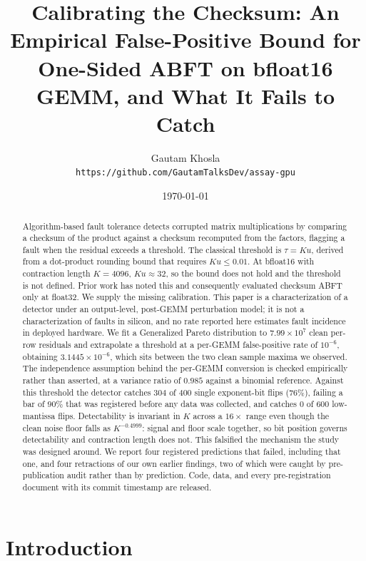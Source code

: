 \documentclass[11pt]{article}
\title{Calibrating the Checksum: An Empirical False-Positive Bound for
One-Sided ABFT on bfloat16 GEMM, and What It Fails to Catch}
\author{Gautam Khosla\\
\texttt{https://github.com/GautamTalksDev/assay-gpu}}
\date{\today}
\begin{document}
\maketitle

\begin{abstract}
Algorithm-based fault tolerance detects corrupted matrix multiplications by
comparing a checksum of the product against a checksum recomputed from the
factors, flagging a fault when the residual exceeds a threshold. The classical
threshold is $\tau = Ku$, derived from a dot-product rounding bound that
requires $Ku \leq 0.01$. At bfloat16 with contraction length $K = 4096$,
$Ku \approx 32$, so the bound does not hold and the threshold is not defined.
Prior work has noted this and consequently evaluated checksum ABFT only at
float32. We supply the missing calibration. This paper is a characterization of
a detector under an output-level, post-GEMM perturbation model; it is not a
characterization of faults in silicon, and no rate reported here estimates
fault incidence in deployed hardware. We fit a Generalized Pareto distribution
to $7.99 \times 10^{7}$ clean per-row residuals and extrapolate a threshold at
a per-GEMM false-positive rate of $10^{-6}$, obtaining
$3.1445 \times 10^{-6}$, which sits between the two clean sample maxima we
observed.
The independence assumption behind the per-GEMM conversion is checked
empirically rather than asserted, at a variance ratio of $0.985$ against a
binomial reference. Against this threshold the detector catches $304$ of $400$
single exponent-bit flips ($76\%$), failing a bar of $90\%$ that was registered
before any data was collected, and catches $0$ of $600$ low-mantissa flips.
Detectability is invariant in $K$ across a $16\times$ range even though the
clean noise floor falls as $K^{-0.4999}$: signal and floor scale together, so
bit position governs detectability and contraction length does not. This
falsified the mechanism the study was designed around. We report four
registered predictions that failed, including that one, and four retractions of
our own earlier findings, two of which were caught by pre-publication audit
rather than by prediction. Code, data, and every pre-registration document with
its commit timestamp are released.
\end{abstract}

\section{Introduction}
\label{sec:intro}
\end{document}
